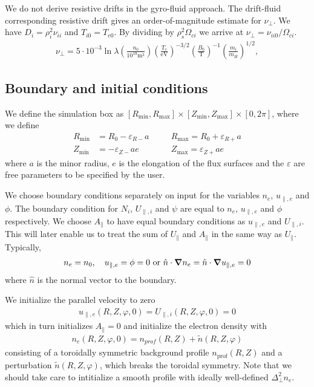 We do not derive resistive drifts in the gyro-fluid approach.
The drift-fluid corresponding resistive drift gives an order-of-magnitude estimate for $\nu_\perp$.
We have  $D_i = \rho_i^2 \nu_{ii}$ and $T_{i0} = T_{e0}$.
By dividing by $\rho_s^2 \Omega_{ci}$ we arrive at $\nu_\perp = \nu_{ii0}/\Omega_{ci}$.
\begin{align}
\nu_\perp =
5\cdot 10^{-3} \ln \lambda
\left(\frac{n_0}{10^{19}\text{m}^3}\right)
\left(\frac{T_e}{\text{eV}}\right)^{-3/2}
\left(\frac{B_0}{\text{T}}\right)^{-1}
\left(\frac{m_i}{m_H}\right)^{1/2},
\end{align}

\subsection{Boundary and initial conditions}
We define the simulation box as
$[ R_{\min}, R_{\max}]\times [Z_{\min}, Z_{\max}] \times [0,2\pi]$,
where we define
\begin{align} \label{eq:box}
    R_{\min}&=R_0-\varepsilon_{R-}a\quad
    &&R_{\max}=R_0+\varepsilon_{R+}a\nonumber\\
    Z_{\min}&=-\varepsilon_{Z-}ae\quad
    &&Z_{\max}=\varepsilon_{Z+}ae
\end{align}
where $a$ is the minor radius, $e$ is the elongation of the flux surfaces and
the $\varepsilon$ are free parameters to be specified by the user.

We choose boundary conditions separately on input for the variables
$n_e$, $u_{\parallel,e}$ and $\phi$. The boundary condition for $N_i$, $U_{\parallel,i}$ and
$\psi$ are equal to $n_e$, $u_{\parallel,e}$ and $\phi$ respectively.
We choose $A_\parallel$ to have equal boundary conditions as $u_{\parallel,e}$ and $U_{\parallel,i}$.
This will later enable us to treat the sum of $U_\parallel$ and $A_\parallel$
in the same way as $U_\parallel$.
Typically,
\begin{align}
n_e = n_0, \quad u_{\parallel,e} = \phi = 0
\text{ or } \hat n \cdot{\boldsymbol{\nabla}} n_e = \hat n \cdot{\boldsymbol{\nabla}} u_{\parallel,e} = 0
\end{align}
where $\hat n$ is the normal vector to the boundary.

We initialize the parallel velocity to zero
\begin{align}
  u_{\parallel,e}(R,Z,\varphi,0) = U_{\parallel,i}(R,Z,\varphi,0) = 0
  \label{}
\end{align}
which in turn initializes $A_\parallel = 0$
and initialize the electron density with
\begin{align} \label{eq:initial_ne}
    n_e(R,Z,\varphi, 0)= n_{prof}(R,Z) + \tilde n(R,Z,\varphi)
\end{align}
consisting of a toroidally symmetric background profile $n_{\text{prof}}(R,Z)$ and a perturbation
$\tilde n(R,Z,\varphi)$, which breaks the toroidal symmetry.
Note that we should take care to intitialize a smooth profile with ideally well-defined $\Delta^2_\perp n_e$.

